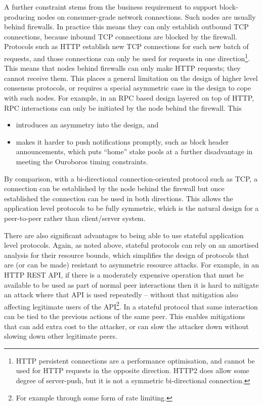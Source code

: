 \documentclass[11pt,a4paper]{article}
\begin{document}
A further constraint stems from the business requirement to support
block-producing nodes on consumer-grade network connections. Such nodes
are usually behind firewalls. In practice this means they can only
establish outbound TCP connections, because inbound TCP connections are
blocked by the firewall. Protocols such as HTTP establish new TCP
connections for each new batch of requests, and those connections can
only be used for requests in one direction\footnote{HTTP persistent
  connections are a performance optimisation, and cannot be used for
  HTTP requests in the opposite direction. HTTP2 does allow some degree
  of server-push, but it is not a symmetric bi-directional connection.}.
This means that nodes behind firewalls can only make HTTP requests; they
cannot receive them. This places a general limitation on the design of
higher level consensus protocols, or requires a special asymmetric case
in the design to cope with such nodes. For example, in an RPC based
design layered on top of HTTP, RPC interactions can only be initiated by
the node behind the firewall. This

\begin{itemize}
\item
  introduces an asymmetry into the design, and
\item
  makes it harder to push notifications promptly, such as block header
  announcements, which puts ``home'' stake pools at a further
  disadvantage in meeting the Ouroboros timing constraints.
\end{itemize}

By comparison, with a bi-directional connection-oriented protocol such
as TCP, a connection can be established by the node behind the firewall
but once established the connection can be used in both directions. This
allows the application level protocols to be fully symmetric, which is
the natural design for a peer-to-peer rather than client/server system.

There are also significant advantages to being able to use stateful
application level protocols. Again, as noted above, stateful protocols
can rely on an amortised analysis for their resource bounds, which
simplifies the design of protocols that are (or can be made) resistant
to asymmetric resource attacks. For example, in an HTTP REST API, if
there is a moderately expensive operation that must be available to be
used as part of normal peer interactions then it is hard to mitigate an
attack where that API is used repeatedly -- without that mitigation also
affecting legitimate users of the API\footnote{For example through some
  form of rate limiting.}. In a stateful protocol that same interaction
can be tied to the previous actions of the same peer. This enables
mitigations that can add extra cost to the attacker, or can slow the
attacker down without slowing down other legitimate peers.
\end{document}
